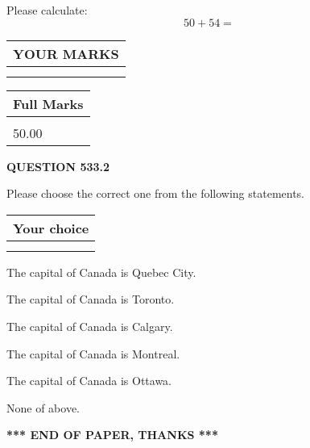 \documentclass[12pt]{article}
\begin{document}
  
 
Please calculate:
\begin{equation}
50 +  %
54 = \nonumber
\end{equation}
 

 

 
  
\vspace{0.2in}
  
\noindent\begin{tabular}{|l|}
\hline
 YOUR MARKS  \\
\hline
 \\ 
 \\ 
\hline
\end{tabular}
\hspace{0.05in} \begin{tabular}{|l|}
\hline
 Full Marks  \\
\hline
 \\ 
50.00 \\
\hline
\end{tabular}
{\textbf{\Large{QUESTION
533.2 
}}}
  
  
Please choose the correct one from the following statements.
  
  
\noindent\hspace{3.0in} \begin{tabular}{|l|}
\hline
Your choice \\
\hline
 \\ 
 \\ 
\hline
\end{tabular}
  
  
 
 
The capital of Canada is Quebec City.
 
 
The capital of Canada is Toronto.
 
 
The capital of Canada is Calgary.
 
 
The capital of Canada is Montreal.
 
 
The capital of Canada is Ottawa.
 
 
 None of above.
 
 
   
   
 \vspace{0.2in}
 
   
   
   
   
\vspace{1.0in} 
{\textbf{\large{ *** END OF PAPER, THANKS *** }}} 
   
\end{document}
